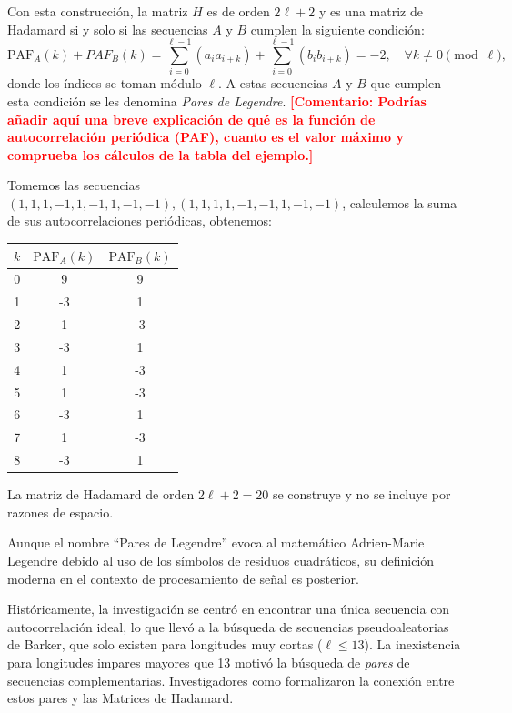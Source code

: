 \documentclass[12pt,a4paper]{tfg_domingo}
\newcommand{\PAF}{\textrm{PAF}}
\newcommand{\Comentario}[1]{\textcolor{red}{\textbf{[Comentario:
      #1]}}}
\begin{document}
Con esta construcción, la matriz $H$ es de orden $2\ell + 2$ y es una
matriz de
Hadamard si y solo si las secuencias $A$ y $B$ cumplen la siguiente
condición:
\[
 \PAF_{A}(k) + PAF_{B}(k) =   \sum_{i=0}^{\ell-1} (a_i a_{i+k}) +\sum_{i=0}^{\ell-1}( b_i b_{i+k}) = -2, \quad \forall k \neq 0 \pmod \ell,
\]
donde los índices se toman módulo $\ell$. A estas secuencias $A$ y $B$
que cumplen esta condición se les denomina \emph{Pares de Legendre}.
\Comentario{Podrías añadir aquí una breve explicación de qué es la
  función de autocorrelación periódica (PAF), cuanto es el valor
  máximo y comprueba los cálculos de la tabla del ejemplo.}
\begin{tcolorbox}[colback=blue!5!white,colframe=blue!75!black,title=Ejemplo de Pares de Legendre]
  Tomemos las secuencias
  $(1, 1, 1, -1, 1, -1, 1, -1, -1), (1, 1, 1, 1, -1, -1, 1, -1, -1)$, calculemos la suma de sus
  autocorrelaciones periódicas, obtenemos:
  \begin{center}
        \begin{tabular}{c|c|c}
          $k$ & $\text{PAF}_A(k)$ & $\text{PAF}_B(k)$ \\
          \hline
          0 & 9 & 9 \\
          1 & -3 & 1 \\
          2 & 1 & -3 \\
          3 & -3 & 1 \\
          4 & 1 & -3 \\
          5 & 1 & -3 \\
          6 & -3 & 1 \\
          7 & 1 & -3 \\
          8 & -3 & 1 \\
        \end{tabular}
      \end{center}

   La matriz de Hadamard de orden $2\ell + 2 = 20$ se construye y no se
   incluye por razones de espacio.  
\end{tcolorbox}


Aunque el nombre ``Pares de Legendre'' evoca al matemático Adrien-Marie Legendre debido
al uso de los símbolos de residuos cuadráticos, su definición moderna
en el contexto de procesamiento de señal es posterior. 

Históricamente, la investigación se centró en encontrar una única
secuencia con autocorrelación ideal, lo que llevó a la búsqueda de
secuencias pseudoaleatorias de Barker, que solo existen para longitudes muy cortas
($\ell \leq 13$). La inexistencia para longitudes impares mayores que 13 motivó la búsqueda
de \emph{pares} de secuencias complementarias. Investigadores como
\cite{seberry1992hadamard} formalizaron la conexión entre estos pares
y las Matrices de Hadamard. 
\end{document}
